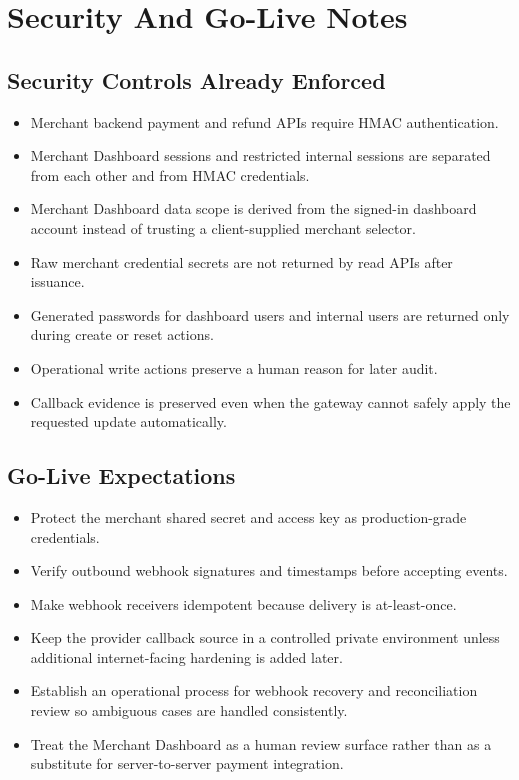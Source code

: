 \section{Security And Go-Live Notes}

\subsection{Security Controls Already Enforced}

\begin{itemize}
  \item Merchant backend payment and refund APIs require HMAC authentication.
  \item Merchant Dashboard sessions and restricted internal sessions are
  separated from each other and from HMAC credentials.
  \item Merchant Dashboard data scope is derived from the signed-in dashboard
  account instead of trusting a client-supplied merchant selector.
  \item Raw merchant credential secrets are not returned by read APIs after
  issuance.
  \item Generated passwords for dashboard users and internal users are returned
  only during create or reset actions.
  \item Operational write actions preserve a human reason for later audit.
  \item Callback evidence is preserved even when the gateway cannot safely apply
  the requested update automatically.
\end{itemize}

\subsection{Go-Live Expectations}

\begin{itemize}
  \item Protect the merchant shared secret and access key as production-grade
  credentials.
  \item Verify outbound webhook signatures and timestamps before accepting
  events.
  \item Make webhook receivers idempotent because delivery is at-least-once.
  \item Keep the provider callback source in a controlled private environment
  unless additional internet-facing hardening is added later.
  \item Establish an operational process for webhook recovery and reconciliation
  review so ambiguous cases are handled consistently.
  \item Treat the Merchant Dashboard as a human review surface rather than as a
  substitute for server-to-server payment integration.
\end{itemize}

